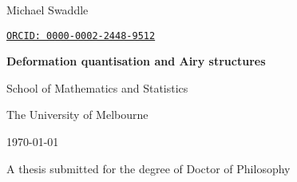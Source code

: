
{

\begin{titlepage}


{\Large Michael Swaddle}

{\tt \href{https://orcid.org/
0000-0002-2448-9512}{ORCID: 0000-0002-2448-9512}}

\vspace{2cm} 


\textbf{\semihuge\color{offblack}  Deformation quantisation and Airy structures}

\vspace{2cm} 



School of Mathematics and Statistics

The University of Melbourne

\today 
\vfill 

{\vspace{2cm}A thesis submitted for the degree of Doctor of Philosophy }





\end{titlepage}
}

